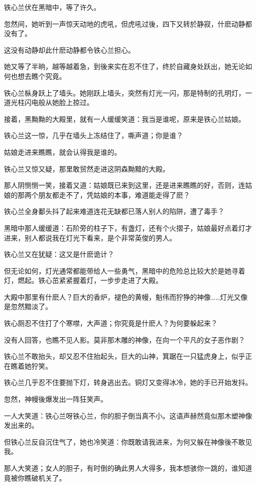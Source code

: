 \documentclass[12pt,oneside]{book}
\begin{document}
铁心兰伏在黑暗中，等了许久。

忽然间，她听到一声惊天动地的虎吼，但虎吼过後，四下又转於静寂，什麽动静都没有了。

这没有动静却此什麽动静都令铁心兰担心。

她又等了半晌，越等越着急，到後来实在忍不住了，终於自藏身处跃出，她无论如何也想去瞧个究竟。

铁心兰枞身跃上了墙头。她刚跃上墙头，突然有灯光一闪，那是特制的孔明灯，一道光柱闪电般从她脸上掠过。

接着，黑黝黝的大殿里，就有一人缓缓笑道：我当是谁呢，原来是铁心兰姑娘。

铁心兰这一惊，几乎在墙头上冻结住了，嘶声道；你是谁？

姑娘走进来瞧瞧，就会认得我是谁的。

铁心兰又惊又疑，那里敢贸然走进这阴森黝黯的大殿。

那人阴恻恻一笑，接着又道：姑娘既已来到这里，还是进来瞧瞧的好，否则，连姑娘的那两个朋友都走不了，凭姑娘的本事，难道能走得了麽？

铁心兰全身鄱头抖了起来难道连花无缺都已落人别人的陷阱，遭了毒手？

黑暗中那人缓缓道：石阶旁的柱子下，有盏灯，还有个火摺子，姑娘最好点着灯才进来，别人都说我在灯光下看来，是个非常英俊的男人。

铁心兰又在犹疑：这又是什麽诡计？

但无论如何，灯光通常都能带给人一些勇气，黑暗中的危险总比较大於是她寻着灯，燃起。铁心茁紧紧握着灯，一步步走进了大殿。

大殿中那里有什麽人？巨大的香炉，褪色的黄幔，魁伟而狞狰的神像\ldots\ldots 灯光又像是忽然黯淡了。

铁心厕忍不住打了个寒噤，大声道；你究竟是什麽人？为何要躲起来？

没有人回答，也瞧不见人影。莫非那木雕的神像，在向一个平凡的女子恶作剧？

铁心兰不敢抬头，却又忍不住抬起头，巨大的山神，箕踞在一只猛虎身上，似乎正在瞧着她狞笑。

铁心兰几乎忍不住要抛下灯，转身逃出去。铜灯又变得冰冷，她的手已开始发抖。

忽然，神幔後爆发出一阵狂笑声。

一人大笑道：铁心兰呀铁心兰，你的胆子倒当真不小。这语声赫然竟似那木塑神像发出来的。

但铁心兰反自沉住气了，她也冷笑道：你既敢请我进来，为何又躲在神像後不敢见我。

那人大笑道；女人的胆子，有时倒的确此男人大得多，我本想骇你一跳的，谁知道竟被你瞧破机关了。
\end{document}
